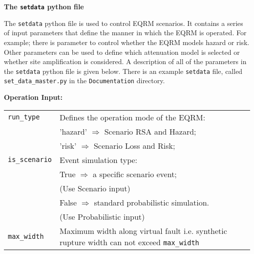 \documentclass[a4paper, 12pt]{report}
\begin{document}
\newcommand{\indexfunc}[1]{\index{#1@\texttt{#1}}\index{function!#1@\texttt{#1}}}
\newcommand{\typepar}[3]{\linebreak[2]\texttt{#1}\-\texttt{#2}\-\texttt{#3}}
\newcommand{\typeself}[3]{\linebreak[2]\texttt{#1}\-\texttt{#2}\-\texttt{#3}\index{#1#2#3@\texttt{#1#2#3}}}
\newcommand{\indexpar}[1]{\index{#1@\texttt{#1}}\index{setdata parameter@ \texttt{setdata} parameter!#1@\texttt{#1}}}
\newcommand{\typefunc}[3]{\linebreak[2]\texttt{#1}\-\texttt{#2}\-\texttt{#3}\indexfunc{#1#2#3}}

\newcommand{\manual}[1]{Manual: #1}

\noindent \textbf{The \texttt{setdata} python file}

The \texttt{setdata} python file is used to control EQRM scenarios. It
contains a series of input parameters that define the
manner in which the EQRM is operated. For example; there is parameter to
control whether the EQRM models hazard or risk. Other parameters can be
used to define which attenuation model is selected or whether site
amplification is considered. A description of all of the parameters in the
 \texttt{setdata} python file is given below. There is an example
\texttt{setdata} file, called \texttt{set\_data\_master.py}
in the \texttt{Documentation} directory.

\vspace{2em} \noindent \textbf{Operation Input:}

\begin{supertabular}{lp{0.6\textwidth}}
\typepar{run\_type}{}{} & Defines the operation mode of the EQRM: \\
  & \hspace{0.5em} 'hazard' $\Rightarrow$ Scenario RSA and Hazard; \\
  & \hspace{0.5em} 'risk' $\Rightarrow$ Scenario Loss and Risk; \\
  \typepar{is\_scenario}{}{} &  Event simulation type: \\
 & \hspace{0.5em} True $\Rightarrow$ a specific scenario event;\\
 & \hspace{2.8em} (Use Scenario input) \\
 & \hspace{0.5em} False $\Rightarrow$ standard probabilistic simulation. \\
 & \hspace{2.8em} (Use Probabilistic input) \\
\typepar{max\_width}{}{} & Maximum width along virtual fault i.e. synthetic rupture width can not exceed \typepar{max\_width}{}{}\\
\end{supertabular}
\end{document}
